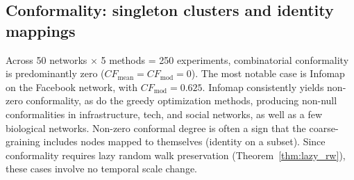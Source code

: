 \documentclass[twocolumn,superscriptaddress,tightenlines,aps,prx,floatfix]{revtex4-2}
\begin{document}
\begin{bibunit}
\subsection{Conformality: singleton clusters and identity mappings}

Across 50 networks $\times$ 5 methods = 250 experiments, combinatorial conformality is predominantly zero ($CF_{\text{mean}} = CF_{\text{mod}} = 0$). The most notable case is Infomap on the Facebook network, with $CF_{\text{mod}} = 0.625$. Infomap consistently yields non-zero conformality, as do the greedy optimization methods, producing non-null conformalities in infrastructure, tech, and social networks, as well as a few biological networks.
Non-zero conformal degree is often a sign that the coarse-graining includes nodes mapped to themselves (identity on a subset). Since conformality requires lazy random walk preservation (Theorem~\ref*{thm:lazy_rw}), these cases involve no temporal scale change.






\end{bibunit}
\end{document}
